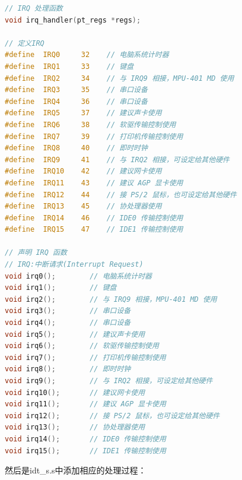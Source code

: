 \begin{lstlisting}[language = C, caption = include/idt.h]
// IRQ 处理函数
void irq_handler(pt_regs *regs);

// 定义IRQ
#define  IRQ0     32 	// 电脑系统计时器
#define  IRQ1     33 	// 键盘
#define  IRQ2     34 	// 与 IRQ9 相接，MPU-401 MD 使用
#define  IRQ3     35 	// 串口设备
#define  IRQ4     36 	// 串口设备
#define  IRQ5     37 	// 建议声卡使用
#define  IRQ6     38 	// 软驱传输控制使用
#define  IRQ7     39 	// 打印机传输控制使用
#define  IRQ8     40 	// 即时时钟
#define  IRQ9     41 	// 与 IRQ2 相接，可设定给其他硬件
#define  IRQ10    42 	// 建议网卡使用
#define  IRQ11    43 	// 建议 AGP 显卡使用
#define  IRQ12    44 	// 接 PS/2 鼠标，也可设定给其他硬件
#define  IRQ13    45 	// 协处理器使用
#define  IRQ14    46 	// IDE0 传输控制使用
#define  IRQ15    47 	// IDE1 传输控制使用

// 声明 IRQ 函数
// IRQ:中断请求(Interrupt Request)
void irq0();		// 电脑系统计时器
void irq1(); 		// 键盘
void irq2(); 		// 与 IRQ9 相接，MPU-401 MD 使用
void irq3(); 		// 串口设备
void irq4(); 		// 串口设备
void irq5(); 		// 建议声卡使用
void irq6(); 		// 软驱传输控制使用
void irq7(); 		// 打印机传输控制使用
void irq8(); 		// 即时时钟
void irq9(); 		// 与 IRQ2 相接，可设定给其他硬件
void irq10(); 		// 建议网卡使用
void irq11(); 		// 建议 AGP 显卡使用
void irq12(); 		// 接 PS/2 鼠标，也可设定给其他硬件
void irq13(); 		// 协处理器使用
void irq14(); 		// IDE0 传输控制使用
void irq15(); 		// IDE1 传输控制使用
\end{lstlisting}

\par 然后是idt\_s.s中添加相应的处理过程：

